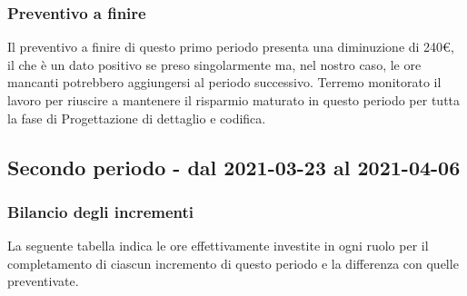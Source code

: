 {{{{{{{{\subsubsection{Preventivo a finire}\label{ConsuntivoPrimoPeriodoDiProgettazioneDiDettaglioCodificaPreventivoFinire}
	Il preventivo a finire di questo primo periodo presenta una diminuzione di 240\euro, il che è un dato positivo se preso singolarmente ma, nel nostro caso, le ore mancanti potrebbero aggiungersi al periodo successivo. Terremo monitorato il lavoro per riuscire a mantenere il risparmio maturato in questo periodo per tutta la fase di Progettazione di dettaglio e codifica.

\subsection{Secondo periodo - dal 2021-03-23 al 2021-04-06 }\label{ConsuntivoSecondoPeriodoDiProgettazioneDiDettaglioCodifica}

\subsubsection{Bilancio degli incrementi}\label{ConsuntivoSecondoPeriodoDiProgettazioneDiDettaglioCodificaIncrementi}

	La seguente tabella indica le ore effettivamente investite in ogni ruolo per il completamento di ciascun incremento di questo periodo e la differenza con quelle preventivate.

\quad
\def\tabularxcolumn#1{m{#1}}
{

}}}}}}}}}
